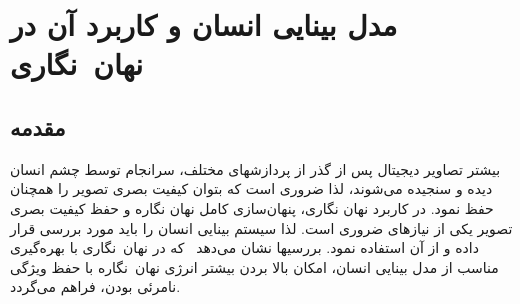 \chapter{مدل بینایی انسان و کاربرد آن در  نهان~نگاری}\label{ch:HVS}
 
\section{مقدمه}
 
بیشتر تصاویر دیجیتال پس از گذر از پردازشهای مختلف، سرانجام توسط چشم انسان 
دیده و سنجیده می‌شوند،  لذا ضروری است که بتوان کیفیت بصری تصویر را همچنان حفظ
نمود. در کاربرد نهان نگاری، پنهان‌سازی کامل نهان نگاره  و حفظ کیفیت بصری تصویر
یکی از نیازهای ضروری است. لذا سیستم بینایی انسان را باید مورد
بررسی قرار داده و از آن استفاده نمود. بررسیها نشان می‌دهد~\cite{LevFo04} 
که در نهان~نگاری با بهره‌گیری مناسب از مدل بینایی انسان، امکان بالا بردن بیشتر 
انرژی  نهان~نگاره با حفظ ویژگی نامرئی بودن، فراهم می‌گردد.


